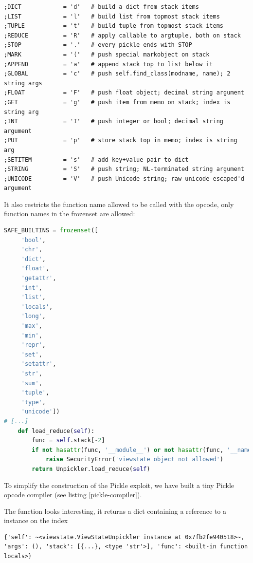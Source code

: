 \documentclass[a4paper]{article}
\begin{document}
\begin{lstlisting}[caption={},numbers=none,style=colortilde]
;DICT            = 'd'   # build a dict from stack items
;LIST            = 'l'   # build list from topmost stack items
;TUPLE           = 't'   # build tuple from topmost stack items
;REDUCE          = 'R'   # apply callable to argtuple, both on stack
;STOP            = '.'   # every pickle ends with STOP
;MARK            = '('   # push special markobject on stack
;APPEND          = 'a'   # append stack top to list below it
;GLOBAL          = 'c'   # push self.find_class(modname, name); 2 string args
;FLOAT           = 'F'   # push float object; decimal string argument
;GET             = 'g'   # push item from memo on stack; index is string arg
;INT             = 'I'   # push integer or bool; decimal string argument
;PUT             = 'p'   # store stack top in memo; index is string arg
;SETITEM         = 's'   # add key+value pair to dict
;STRING          = 'S'   # push string; NL-terminated string argument
;UNICODE         = 'V'   # push Unicode string; raw-unicode-escaped'd argument
\end{lstlisting}

It also restricts the function name allowed to be called with the  opcode, only function names in the  frozenset are allowed:

\begin{lstlisting}[language=Python,caption={},numbers=none,style=colortilde]
    SAFE_BUILTINS = frozenset([
     'bool',
     'chr',
     'dict',
     'float',
     'getattr',
     'int',
     'list',
     'locals',
     'long',
     'max',
     'min',
     'repr',
     'set',
     'setattr',
     'str',
     'sum',
     'tuple',
     'type',
     'unicode'])
# [...]
    def load_reduce(self):
        func = self.stack[-2]
        if not hasattr(func, '__module__') or not hasattr(func, '__name__') or func.__module__ != '__builtin__' or func.__name__ not in self.SAFE_BUILTINS:
            raise SecurityError('viewstate object not allowed')
        return Unpickler.load_reduce(self)
\end{lstlisting}

To simplify the construction of the Pickle exploit, we have built a tiny Pickle opcode compiler (see listing \ref{pickle-compiler}).

The  function looks interesting, it returns a dict containing a reference to a  instance on the index 
\begin{lstlisting}[caption={},numbers=none,style=colortilde]
{'self': ~<viewstate.ViewStateUnpickler instance at 0x7fb2fe940518>~, 'args': (), 'stack': [{...}, <type 'str'>], 'func': <built-in function locals>}
\end{lstlisting}
\end{document}
